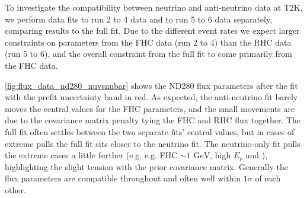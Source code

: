 To investigate the compatibility between neutrino and anti-neutrino data at T2K, we perform data fits to run 2 to 4 data and to run 5 to 6 data separately, comparing results to the full fit. Due to the different event rates we expect larger constraints on parameters from the FHC data (run 2 to 4) than the RHC data (run 5 to 6), and the overall constraint from the full fit to come primarily from the FHC data. 

\autoref{fig:flux_data_nd280_nuvsnubar} shows the ND280 flux parameters after the fit with the prefit uncertainty band in red. As expected, the anti-neutrino fit barely moves the central values for the FHC parameters, and the small movements are due to the covariance matrix penalty tying the FHC and RHC flux together. The full fit often settles between the two separate fits' central values, but in cases of extreme pulls the full fit sits closer to the neutrino fit. The neutrino-only fit pulls the extreme cases a little further (e.g. e.g. FHC \numu $\sim1\text{ GeV}$, high $E_\nu$ \numu and \numubar), highlighting the slight tension with the prior covariance matrix. Generally the flux parameters are compatible throughout and often well within $1\sigma$ of each other.

